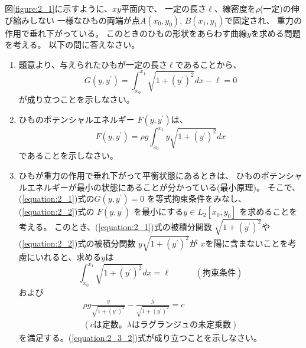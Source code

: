図\ref{figure:2_1}に示すように、\(xy\)平面内で、
一定の長さ\(\ell\)、線密度を\(\rho\)(一定)の伸び縮みしない
一様なひもの両端が点\(A\left(x_{0}, y_{0}\right)\),
\(B\left(x_{1}, y_{1}\right)\)で固定され、
重力の作用で垂れ下がっている。
このときのひもの形状をあらわす曲線\(y\)を求める問題を考える。
以下の問に答えなさい。

\begin{enumerate}
  \item 題意より、与えられたひもが一定の長さ\(\ell\)であることから、
  \begin{equation}\label{equation:2_1}
    G \left(y, y^{\prime}\right) = \int_{x_{0}}^{x_{1}} \sqrt{1 + \left(y^{\prime}\right)^2} dx - \ell = 0
  \end{equation}
  が成り立つことを示しなさい。

  \item ひものポテンシャルエネルギー
  \(F\left(y, y^{\prime}\right)\)は、
  \begin{equation}\label{equation:2_2}
    F\left(y, y^{\prime}\right) = \rho g \int_{x_{0}}^{x_{1}} y \sqrt{1 + \left(y^{\prime}\right)^2} dx
  \end{equation}
  であることを示しなさい。

  \item ひもが重力の作用で垂れ下がって平衡状態にあるときは、
  ひものポテンシャルエネルギーが最小の状態にあることが分かっている(最小原理)。
  そこで、(\ref{equation:2_1})式の\(G \left(y, y^{\prime}\right) = 0\)
  を等式拘束条件をみなし、(\ref{equation:2_2})式の
  \(F\left(y, y^{\prime}\right)\)
  を最小にする\(y \in L_{2} \left[x_{0}, y_{0}\right]\)
  を求めることを考える。
  このとき、(\ref{equation:2_1})式の被積分関数
  \(\sqrt{1 + \left(y^{\prime}\right)^{2}}\)や
  (\ref{equation:2_2})式の被積分関数
  \(y \sqrt{1 + \left(y^{\prime}\right)^{2}}\)が
  \(x\)を陽に含まないことを考慮にいれると、求める\(y\)は
  \begin{equation}\label{equation:2_3_1}
     \int_{x_{0}}^{x_{1}} \sqrt{1 + \left(y^{\prime}\right)^{2}} dx = \ell
    \qquad\quad(拘束条件)
  \end{equation}
  および
  \begin{equation}\label{equation:2_3_2}
    \begin{split}
      \rho g \frac{y}{\sqrt{1 + \left(y^{\prime}\right)^{2}}} - \frac{\lambda}{\sqrt{1 + \left(y^{\prime}\right)^{2}}} = c \\
      (cは定数。\lambda はラグランジュの未定乗数)
    \end{split}
  \end{equation}
  を満足する。(\ref{equation:2_3_2})式が成り立つことを示しなさい。


\end{enumerate}
